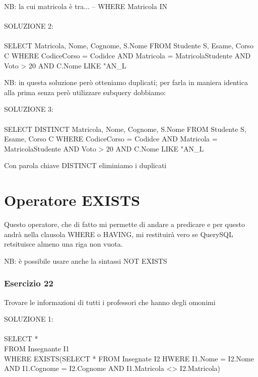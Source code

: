 \documentclass[12pt,a4paper]{book}
\begin{document}
NB: la cui matricola è tra... -- WHERE Matricola IN\\
\\
SOLUZIONE 2:\\
\\
SELECT Matricola, Nome, Cognome, S.Nome
FROM Studente S, Esame, Corso C
WHERE CodiceCorso = Codidce AND Matricola = MatricolaStudente AND Voto > 20 AND C.Nome LIKE "AN_L%

NB: in questa soluzione però otteniamo duplicati; per farla in maniera identica alla prima senza però utilizzare subquery dobbiamo:

SOLUZIONE 3:\\
\\
SELECT DISTINCT Matricola, Nome, Cognome, S.Nome
FROM Studente S, Esame, Corso C
WHERE CodiceCorso = Codidce AND Matricola = MatricolaStudente AND Voto > 20 AND C.Nome LIKE "AN_L%

Con parola chiave DISTINCT eliminiamo i duplicati 

\section{Operatore EXISTS}
Questo operatore, che di fatto mi permette di andare a predicare e per questo andrà nella clausola WHERE o HAVING, mi restituirà vero se QuerySQL retsituisce almeno una riga non vuota.

NB: è possibile usare anche la sintassi NOT EXISTS

\subsubsection{Esercizio 22}
Trovare le informazioni di tutti i professori che hanno degli omonimi

SOLUZIONE 1:\\
\\
SELECT *\\
FROM Insegnante I1\\
WHERE EXISTS(SELECT * FROM Insegnate I2 HWERE I1.Nome = I2.Nome AND I1.Cognome = I2.Cognome AND I1.Matricola <> I2.Matricola)
\end{document}
